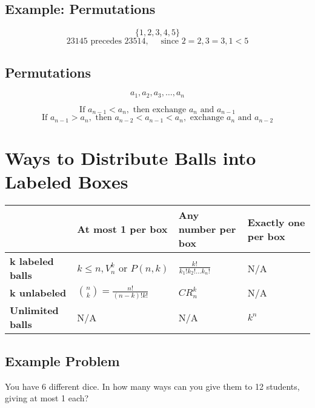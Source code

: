 \documentclass[11pt]{article}
\begin{document}
\subsection*{Example: Permutations}
\[
\{1, 2, 3, 4, 5\}
\]
\[
23145 \text{ precedes } 23514, \quad \text{  since } 2 = 2, 3 = 3, 1 < 5
\]

\subsection{Permutations}
\[
a_1, a_2, a_3, \dots, a_n
\]

\[ 
\text{If } a_{n - 1} < a_n, \text{ then exchange } a_n \text{ and } a_{n - 1}
\]
\[
\text{If } a_{n - 1} > a_n, \text{ then } a_{n - 2} < a_{n - 1} < a_n, \text{ exchange } a_n \text{ and } a_{n - 2}
\]

\renewcommand{\arraystretch}{2.5} %

\section*{Ways to Distribute Balls into Labeled Boxes}

\begin{center}
    \begin{tabular}{|>{\centering\arraybackslash}m{2.5cm}|>{\centering\arraybackslash}m{3.5cm}|>{\centering\arraybackslash}m{3.5cm}|>{\centering\arraybackslash}m{3.5cm}|}
    \hline
     & \textbf{At most 1 per box} & \textbf{Any number per box} & \textbf{Exactly one per box} \\
    \hline
    \textbf{k labeled balls} & $k \leq n, V_n^k \text{ or } P(n,k)$ & $\displaystyle\frac{k!}{k_1! k_2! \dots k_n!}$ & \cellcolor{gray!50} N/A \\  
    \hline
    \textbf{k unlabeled} & $\displaystyle\binom{n}{k} = \frac{n!}{(n-k)!k!}$ & $\displaystyle CR_n^k$ & \cellcolor{gray!50} N/A \\  
    \hline
    \textbf{Unlimited balls} & \cellcolor{gray!50} N/A & \cellcolor{gray!50} N/A & $\displaystyle k^n$ \\  
    \hline
    \end{tabular}
\end{center}

\subsection*{Example Problem}

You have 6 different dice. In how many ways can you give them to 12 students, giving at most 1 each?
\end{document}
